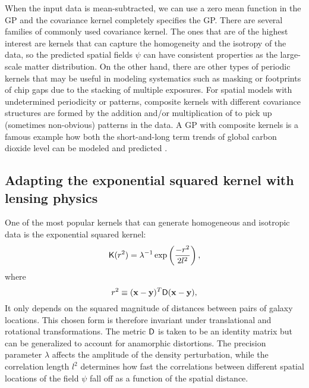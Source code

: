 When the input data is mean-subtracted, we can use a zero mean function in the
GP and the covariance kernel completely specifies the GP. 
There are several families of commonly used covariance kernel.
The ones that are of the highest interest are kernels that can capture 
the homogeneity and the isotropy of the data, so the predicted spatial fields
$\psi$ can have consistent properties as the large-scale matter distribution.
On the other hand, there are other types of periodic kernels that may be useful
in modeling systematics such as masking or footprints of chip gaps due to the
stacking of multiple exposures.
For spatial models with undetermined periodicity or patterns, 
composite kernels with different covariance structures 
are formed by the addition and/or multiplication of
 to pick up (sometimes non-obvious) patterns in the data. 
A GP with composite kernels is a
famous example how both the short-and-long term trends of global carbon
dioxide level can be modeled and predicted \citep{Duvenaud2013}.

\subsection{Adapting the exponential squared kernel with lensing physics}
One of the most popular kernels that can generate homogeneous and
isotropic data is the exponential squared kernel: 
\begin{equation}
	\mathsf{K}(r^2) = \lambda^{-1} \exp\left(\frac{-r^2}{2 l^2}\right),
	\label{eq:exp_sq_kernel}
\end{equation}
where 
\begin{equation}
	r^2 \equiv (\mathbf{x} - \mathbf{y})^T \mathsf{D} (\mathbf{x} - \mathbf{y}), 
\end{equation}
It only depends on the
squared magnitude of distances between pairs of galaxy locations. 
This chosen form is therefore invariant
under translational and rotational transformations.
The metric $\mathsf{D}$ is taken to be an identity matrix but  
can be generalized to account for anamorphic distortions. 
The precision parameter $\lambda$ affects the 
amplitude of the density perturbation, while the correlation length $l^2$ 
determines how fast the correlations between different spatial locations of the
field $\psi$ fall off as a function of the spatial distance.

